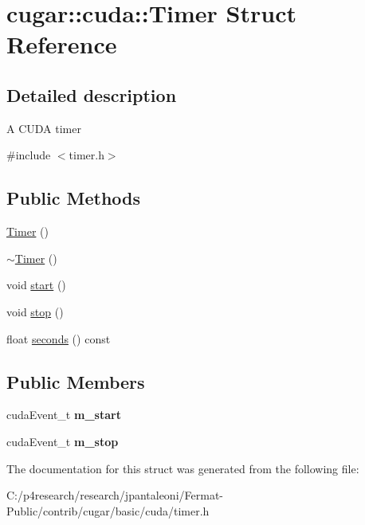 \hypertarget{structcugar_1_1cuda_1_1_timer}{}\section{cugar\+:\+:cuda\+:\+:Timer Struct Reference}
\label{structcugar_1_1cuda_1_1_timer}


\subsection{Detailed description}
A C\+U\+DA timer 

{\ttfamily \#include $<$timer.\+h$>$}

\subsection*{Public Methods}
\begin{DoxyCompactItemize}
\item 
\hyperlink{group___c_u_d_a_module_ga27675d4d89a40e592d9f85789d951604}{Timer} ()
\item 
\hyperlink{group___c_u_d_a_module_gae7e683c7100a98ed350987e39e221c67}{$\sim$\+Timer} ()
\item 
void \hyperlink{group___c_u_d_a_module_ga01d05872296e3fde547ec5f57b092038}{start} ()
\item 
void \hyperlink{group___c_u_d_a_module_gaa3d28081d1d907e01ad0533197189009}{stop} ()
\item 
float \hyperlink{group___c_u_d_a_module_ga86d41374527206653bad805dd13adfbc}{seconds} () const
\end{DoxyCompactItemize}
\subsection*{Public Members}
\begin{DoxyCompactItemize}
\item 
\mbox{\label{structcugar_1_1cuda_1_1_timer_aaf1feea024714b11ef9ef5d9dcdf00fe}} 
cuda\+Event\+\_\+t {\bfseries m\+\_\+start}
\item 
\mbox{\label{structcugar_1_1cuda_1_1_timer_a853228ef39eb9db6d5aacd638f4effed}} 
cuda\+Event\+\_\+t {\bfseries m\+\_\+stop}
\end{DoxyCompactItemize}


The documentation for this struct was generated from the following file\+:\begin{DoxyCompactItemize}
\item 
C\+:/p4research/research/jpantaleoni/\+Fermat-\/\+Public/contrib/cugar/basic/cuda/timer.\+h\end{DoxyCompactItemize}
